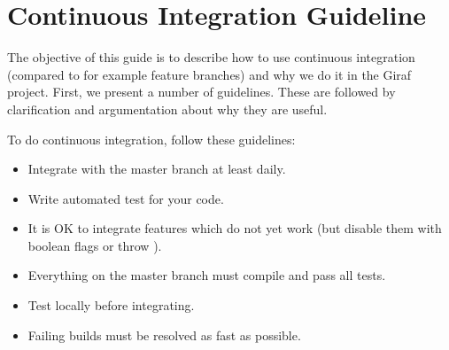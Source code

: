 \chapter{Continuous Integration Guideline}\label{app:ci_guide}
The objective of this guide is to describe how to use continuous integration (compared to for example feature branches) and why we do it in the Giraf project. First, we present a number of guidelines. These are followed by clarification and argumentation about why they are useful.

To do continuous integration, follow these guidelines:
\begin{multicols}{2}
\begin{itemize}
  \item Integrate with the master branch at least daily.
  \item Write automated test for your code.
  \item It is OK to integrate features which do not yet work (but disable them with boolean flags or throw ).
  \columnbreak
  \item Everything on the master branch must compile and pass all tests.
  \item Test locally before integrating.
  \item Failing builds must be resolved as fast as possible.
\end{itemize}
\end{multicols}

